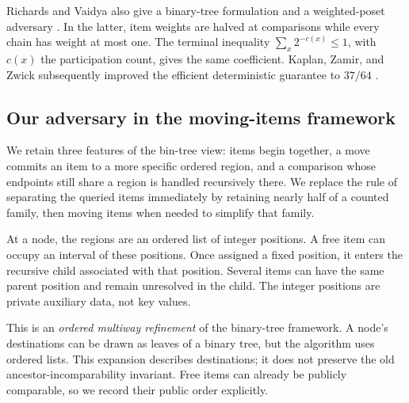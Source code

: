 Richards and Vaidya also give a binary-tree formulation and a weighted-poset
adversary \citep[Sections~3--4]{RichardsVaidya1988}. In the latter, item
weights are halved at comparisons while every chain has weight at most one.
The terminal inequality $\sum_x2^{-c(x)}\leq1$, with $c(x)$ the participation
count, gives the same coefficient. Kaplan, Zamir, and Zwick subsequently
improved the efficient deterministic guarantee to $37/64$
\citep{KaplanZamirZwick2019}.

\subsection{Our adversary in the moving-items framework}
\label{sec:framework}

We retain three features of the bin-tree view: items begin together, a move
commits an item to a more specific ordered region, and a comparison whose
endpoints still share a region is handled recursively there. We replace the
rule of separating the queried items immediately by retaining nearly half
of a counted family, then moving items when needed to simplify that family.

At a node, the regions are an ordered list of integer positions. A free item
can occupy an interval of these positions. Once assigned a fixed position,
it enters the recursive child associated with that position. Several items
can have the same parent position and remain unresolved in the child.
The integer positions are private auxiliary data, not key values.

This is an \emph{ordered multiway refinement} of the binary-tree framework.
A node's destinations can be drawn as leaves of a binary tree, but the
algorithm uses ordered lists. This expansion describes destinations; it does
not preserve the old ancestor-incomparability invariant. Free items can
already be publicly comparable, so we record their public order explicitly.

